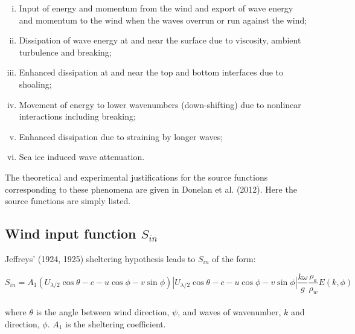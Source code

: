 \documentclass[letterpaper]{article}
\numberwithin{equation}{section}
\begin{document}
\begin{enumerate}[(i)]
\item Input of energy and momentum from the wind and export of wave energy and momentum to the wind when the waves overrun or run against the wind; \\

\item Dissipation of wave energy at and near the surface due to viscosity, ambient turbulence and breaking; \\

\item Enhanced dissipation at and near the top and bottom interfaces due to shoaling; \\

\item Movement of energy to lower wavenumbers (down-shifting) due to nonlinear interactions including breaking; \\

\item Enhanced dissipation due to straining by longer waves; \\

\item Sea ice induced wave attenuation. \\
\end{enumerate}

The theoretical and experimental justifications for the source functions 
corresponding to these phenomena are given in Donelan et al. (2012). 
Here the source functions are simply listed.

\subsection{Wind input function $S_{in}$}

Jeffreys' (1924, 1925) sheltering hypothesis leads to $S_{in}$ of the form:

\begin{equation}
S_{in}=A_{1}\left(U_{\lambda/2}\cos{\theta}-c-u\cos{\phi}-v\sin{\phi}\right)
            \left|U_{\lambda/2}\cos{\theta}-c-u\cos{\phi}-v\sin{\phi}\right|
            \dfrac{k\omega}{g}\dfrac{\rho_{a}}{\rho_{w}}E(k,\phi)
\label{sin1} 
\end{equation}
\\
where $\theta$ is the angle between wind direction, $\psi$,
and waves of wavenumber, $k$ and direction, $\phi$. $A_{1}$ is the sheltering coefficient.
\end{document}

